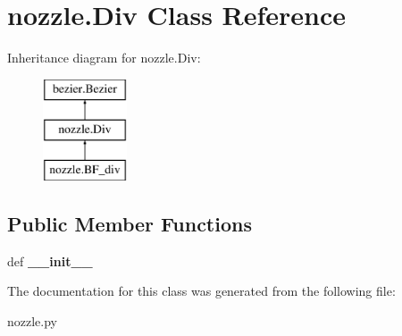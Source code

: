 \hypertarget{classnozzle_1_1Div}{\section{nozzle.\-Div \-Class \-Reference}
\label{classnozzle_1_1Div}
}
\-Inheritance diagram for nozzle.\-Div\-:\begin{figure}[H]
\begin{center}
\leavevmode
\includegraphics[height=3.000000cm]{classnozzle_1_1Div}
\end{center}
\end{figure}
\subsection*{\-Public \-Member \-Functions}
\begin{DoxyCompactItemize}
\item 
\hypertarget{classnozzle_1_1Div_a891afdf97cfb67f01f318f77c700d576}{def {\bfseries \-\_\-\-\_\-init\-\_\-\-\_\-}}\label{classnozzle_1_1Div_a891afdf97cfb67f01f318f77c700d576}

\end{DoxyCompactItemize}


\-The documentation for this class was generated from the following file\-:\begin{DoxyCompactItemize}
\item 
nozzle.\-py\end{DoxyCompactItemize}
